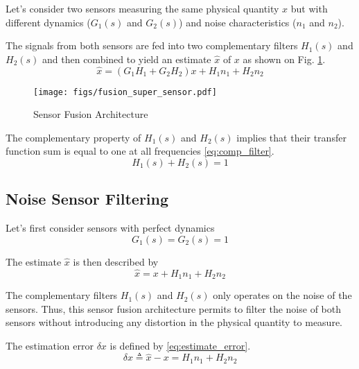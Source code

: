 \documentclass[letterpaper, 10 pt, conference]{ieeeconf}
\begin{document}
Let's consider two sensors measuring the same physical quantity \(x\) but with different dynamics (\(G_1(s)\) and \(G_2(s)\)) and noise characteristics (\(n_1\) and \(n_2\)).

The signals from both sensors are fed into two complementary filters \(H_1(s)\) and \(H_2(s)\) and then combined to yield an estimate \(\hat{x}\) of \(x\) as shown on Fig. \ref{fig:fusion_super_sensor}.
\begin{equation}
\label{eq:comp_filter_estimate}
  \hat{x} = \left(G_1 H_1 + G_2 H_2\right) x + H_1 n_1 + H_2 n_2
\end{equation}

\begin{figure}[htbp]
\centering
\texttt{[image: figs/fusion\_super\_sensor.pdf]}
\caption{\label{fig:fusion_super_sensor}
Sensor Fusion Architecture}
\end{figure}

The complementary property of \(H_1(s)\) and \(H_2(s)\) implies that their transfer function sum is equal to one at all frequencies \eqref{eq:comp_filter}.
\begin{equation}
\label{eq:comp_filter}
  H_1(s) + H_2(s) = 1
\end{equation}

\subsection{Noise Sensor Filtering}
\label{sec:org0ee5b17}
\label{sec:noise_filtering}

Let's first consider sensors with perfect dynamics
\begin{equation}
\label{eq:perfect_dynamics}
  G_1(s) = G_2(s) = 1
\end{equation}

The estimate \(\hat{x}\) is then described by
\begin{equation}
\label{eq:estimate_perfect_dyn}
  \hat{x} = x + H_1 n_1 + H_2 n_2
\end{equation}

The complementary filters \(H_1(s)\) and \(H_2(s)\) only operates on the noise of the sensors.
Thus, this sensor fusion architecture permits to filter the noise of both sensors without introducing any distortion in the physical quantity to measure.

The estimation error \(\delta x\) is defined by \eqref{eq:estimate_error}.
\begin{equation}
\label{eq:estimate_error}
  \delta x \triangleq \hat{x} - x = H_1 n_1 + H_2 n_2
\end{equation}
\end{document}
